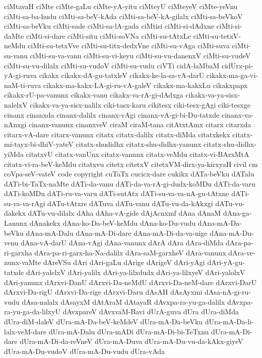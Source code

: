 {ciMtavaH
ciMte
ciMte-gaLu
ciMte-yA-yitu
ciMteyU
ciMteyeV
ciMte-yeVnu
ciMti-sa-ba-hudu
ciMti-sa-beV-kAda
ciMti-sa-beV-kA-gilalx
ciMti-sa-beVkoV
ciMti-sa-beVku
ciMti-sade
ciMti-sa-lA-gada
ciMtisi
ciMti-si-dAdxne
ciMti-si-daMte
ciMti-si-dare
ciMti-situ
ciMti-soVNa
ciMti-su-tAtxLe
ciMti-su-tetxV-neMdu
ciMti-su-tetxVve
ciMti-su-titx-dedxVne
ciMti-su-vAga
ciMti-suva
ciMti-su-vanu
ciMti-su-va-vanu
ciMti-su-vi-keyu
ciMti-su-vu-danenxV
ciMti-su-vudeV
ciMti-su-vu-dilalx
ciMti-su-vudoV
ciMti-su-vudu
ciVTi
cidA-laMbaM
cidUrx-pi-yA-gi-ruva
cikakx
cikakx-dA-gu-tatxleV
cikakx-ke-la-sa-vA-darU
cikakx-ma-ga-vi-naM-ti-ruva
cikakx-ma-kakx-LA-gi-ru-vA-galeV
cikakx-ma-kakxLu
cikakxpapx
cikakx-rU-pa-vanunx
cikakx-vanu
cikakx-va-rA-gi-dAdxga
cikakx-va-ya-sisx-nalelxV
cikakx-va-ya-sisx-nalilx
ciki-tasx-karu
cikitesx
ciki-tesx-gAgi
ciki-tesxge
cinanx
cinanxda
cinanx-dalilx
cinanx-vAgi
cinanx-vA-gi-bi-Du-tatxde
cinanx-va-nAnxgi
cinanx-vanunx
cinanxveV
ciraM
ciraM-tana
citAtxtAmx
citarx
citarxda
citarx-vA-dare
citarx-vanunx
citatx
citatx-dalilx
citatx-diMda
citatxkekx
citatx-mi-tayx-bi-dhiV-yateV
citatx-shudidhx
citatx-shu-didhx-yanunx
citatx-shu-didhx-yiMda
citatxvU
citatx-vanUnx
citatx-vanunx
citatx-veMdu
citatx-vi-BArxMtA
citatx-vi-ra-beV-keMdu
citatxvu
citetx
citetxV
citetxVM-dirx-ya-kirxyaH
civil
cm
coVpa-seV-vateV
code
copyright
cuTaTx
cucicx-dare
cukikx
dATa-beVku
dATalu
dATi-bi-TaTx-naMte
dATi-da-vanu
dATi-da-va-rA-gi-dudx-koMDu
dATi-da-varu
dATi-koMDu
dATi-ru-va-varu
dATi-sutAtx
dATi-su-va-va-nA-gu-tAtxne
dATi-su-va-va-rAgi
dATu-tAtxre
dATuva
dATu-vanu
dATu-vu-da-kAkxgi
dATu-vu-dakekx
dATu-vu-dilalx
dAha
dAha-vA-gide
dAjAcnxmf
dAna
dAnaM
dAna-ga-Lanunx
dAnakekx
dAna-ko-Da-beV-keMdu
dAna-ko-Du-vudu
dAna-mA-Da-beVku
dAna-mA-Dalu
dAna-mA-Di-dare
dAna-mA-Di-da-va-nige
dAna-mA-Du-venu
dAna-vA-darU
dAna-vAgi
dAna-vanunx
dArA
dAra
dAra-diMda
dAra-pa-ri-garxha
dAra-pa-ri-garx-ha-Na-dalilx
dAra-saM-garxheV
dAra-vanunx
dAra-ve-nunx-vaMte
dAreVSu
dAri
dAri-gaLu
dArige
dArigeV
dAri-yAgi
dAri-yA-gu-tatxde
dAri-yalelxV
dAri-yalilx
dAri-ya-lilxdudx
dAri-ya-lilxyeV
dAri-yalolxV
dAri-yanunx
dArxvi-DanU
dArxvi-Da-neMdU
dArxvi-Da-neM-dare
dArxvi-DarU
dArxvi-Da-rigU
dArxvi-Da-rige
dArxvi-Daru
dAsAH
dAsAyxmi
dAsa-nA-gi-ru-vudu
dAsa-nalalx
dAsayxM
dAtAraM
dAtayaR
dAvxpa-ra-yu-ga-dalilx
dAvxpa-ra-yu-ga-da-lilxyU
dAvxpareV
dAvxvaM-Bavi
dUrA-guva
dUra
dUra-diMda
dUra-diM-daleV
dUra-mA-Da-beV-keMdeV
dUra-mA-Da-beVku
dUra-mA-Da-li-lalx-veM-dare
dUra-mA-Dalu
dUra-mADi
dUra-mA-Di-bi-TeTxnu
dUra-mA-Di-dare
dUra-mA-Di-da-reVneV
dUra-mA-Duva
dUra-mA-Du-vu-da-kAkx-giyeV
dUra-mA-Du-vudoV
dUra-mA-Du-vudu
dUra-vAda
}
